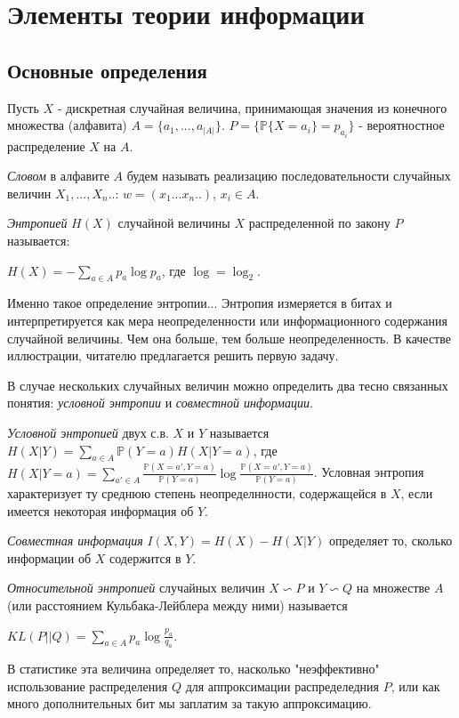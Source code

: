 \section{Элементы теории информации}

\subsection{Основные определения}
Пусть $X$ - дискретная случайная величина, принимающая значения из конечного множества (алфавита) $A = \{a_1,..., a_{|A|}\}$. $P = \{\mathbb{P}\{X = a_i\} = p_{a_i}\}$ - вероятностное распределение $X$ на $A$.

\begin{definition} \textit{Словом} в алфавите $A$ будем называть реализацию последовательности случайных величин $X_1,...,X_n..$: $w = (x_1...x_n..)$, $x_i \in A$.
\end{definition}

\begin{definition} 
\textit{Энтропией} $H(X)$ случайной величины $X$ распределенной по закону $P$ называется:
\begin{center}
$H(X) = - \sum_{a \in A} p_a\log p_a$, где $\log = \log_2$.
\end{center}
Именно такое определение энтропии...
Энтропия измеряется в битах и интерпретируется как мера неопределенности или информационного содержания случайной величины. Чем она больше, тем больше неопределенность. В качестве иллюстрации, читателю предлагается решить первую задачу.
\end{definition}
В случае нескольких случайных величин можно определить два тесно связанных понятия: \textit{условной энтропии} и \textit{совместной информации}.
\begin{definition}
\textit{Условной энтропией} двух с.в. $X$ и $Y$ называется $H(X|Y) = \sum_{a \in A} \mathbb{P}(Y = a)H(X|Y=a)$, где $H(X|Y=a) = \sum_{a' \in A} \frac{\mathbb{P}(X = a', Y = a)}{\mathbb{P}(Y = a)} \log \frac{\mathbb{P}(X = a', Y = a)}{\mathbb{P}(Y = a)}$. Условная энтропия характеризует ту среднюю степень неопределнности, содержащейся в $X$, если имеется некоторая информация об $Y$.
\end{definition}

\begin{definition}
\textit{Совместная информация} $I(X,Y) = H(X) - H(X|Y)$ определяет то, сколько информации об $X$ содержится в $Y$.
\end{definition}

\begin{definition}
\textit{Относительной энтропией} случайных величин $X \backsim P$ и $Y \backsim Q$ на множестве $A$ (или расстоянием Кульбака-Лейблера между ними) называется
\begin{center}
$KL(P||Q) = \sum_{a \in A} p_a \log \frac{p_a}{q_a}$. 
\end{center}
В статистике эта величина определяет то, насколько "неэффективно" использование распределения $Q$ для аппроксимации распределедния $P$, или как много дополнительных бит мы заплатим за такую аппроксимацию.
\end{definition}

